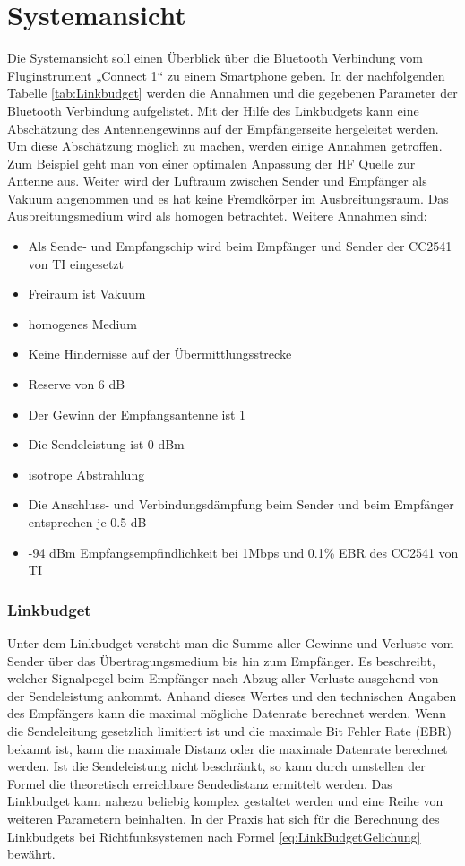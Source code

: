 \section{Systemansicht}
Die Systemansicht soll einen Überblick über die Bluetooth Verbindung vom Fluginstrument „Connect 1“ zu einem Smartphone geben.
In der nachfolgenden Tabelle \ref{tab:Linkbudget} werden die Annahmen und  die gegebenen Parameter der Bluetooth Verbindung aufgelistet. Mit der Hilfe des Linkbudgets kann eine Abschätzung des Antennengewinns auf der Empfängerseite hergeleitet werden. Um diese Abschätzung möglich zu machen, werden einige Annahmen getroffen. Zum Beispiel geht man von einer optimalen Anpassung der HF Quelle zur Antenne aus. Weiter wird der Luftraum zwischen Sender und Empfänger als Vakuum angenommen und es hat keine Fremdkörper im Ausbreitungsraum. Das Ausbreitungsmedium wird als homogen betrachtet.
Weitere Annahmen sind:
\begin{itemize}
\item Als Sende- und Empfangschip wird beim Empfänger und Sender der CC2541 von TI eingesetzt
\item Freiraum ist Vakuum
\item homogenes Medium
\item Keine Hindernisse auf der Übermittlungsstrecke
\item Reserve von 6 dB

\item Der Gewinn der Empfangsantenne ist 1
\item Die Sendeleistung ist 0 dBm
\item isotrope Abstrahlung
\item Die Anschluss- und Verbindungsdämpfung beim Sender und beim Empfänger entsprechen je 0.5 dB
\item -94 dBm Empfangsempfindlichkeit bei 1Mbps und 0.1\% EBR des CC2541 von TI
\end{itemize}


\subsubsection{Linkbudget}
Unter dem Linkbudget versteht man die Summe aller Gewinne und Verluste vom Sender über das Übertragungsmedium bis hin zum Empfänger. Es beschreibt, welcher Signalpegel beim Empfänger nach Abzug aller Verluste ausgehend von der Sendeleistung ankommt. Anhand dieses Wertes und den technischen Angaben des Empfängers kann   die maximal mögliche Datenrate berechnet werden. Wenn die Sendeleitung gesetzlich limitiert ist und die maximale Bit Fehler Rate (EBR) bekannt ist, kann die maximale Distanz oder die maximale Datenrate berechnet werden. Ist die Sendeleistung nicht beschränkt, so kann durch umstellen der Formel die theoretisch erreichbare Sendedistanz ermittelt werden. 
Das Linkbudget kann  nahezu beliebig komplex gestaltet werden und eine  Reihe von weiteren Parametern beinhalten. In der Praxis hat sich für die Berechnung des Linkbudgets bei Richtfunksystemen nach  Formel \ref{eq:LinkBudgetGelichung} bewährt.


